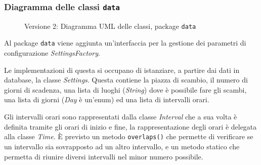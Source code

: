 \subsubsection{Diagramma delle classi \texttt{data}}
\vspace{0.5cm}
\begin{figure}[H]
    \centering
    \caption{Versione 2: Diagramma UML delle classi, package \texttt{data}}
    \label{fig:class_data_v_2}
\end{figure}

Al package \texttt{data} viene aggiunta un'interfaccia per la gestione dei parametri di configurazione \textit{SettingsFactory}.

Le implementazioni di questa si occupano di istanziare, a partire dai dati in database, la classe \textit{Settings}.
Questa contiene la piazza di scambio, il numero di giorni di scadenza, una lista di luoghi (\textit{String}) dove è possibile fare gli scambi,
una lista di giorni (\textit{Day} è un'enum) ed una lista di intervalli orari.

Gli intervalli orari sono rappresentati dalla classe \textit{Interval} che a sua volta è definita tramite gli orari di inizio e fine, la rappresentazione
degli orari è delegata alla classe \textit{Time}. È previsto un metodo \texttt{overlaps()} che permette di verificare se un intervallo sia sovrapposto
ad un altro intervallo, e un metodo statico che permetta di riunire diversi intervalli nel minor numero possibile.